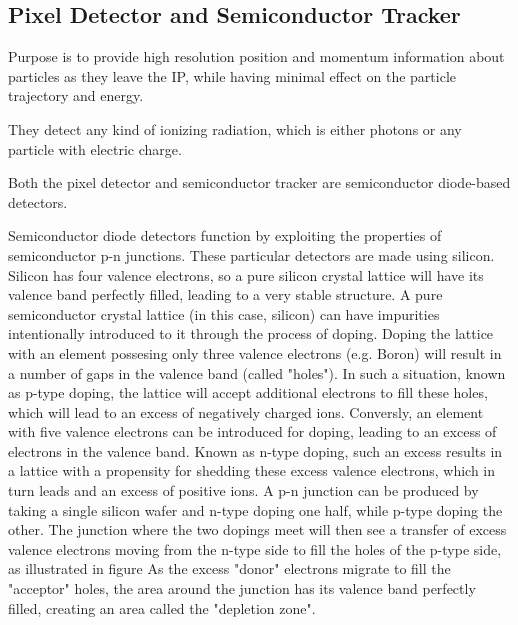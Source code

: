     \subsection{Pixel Detector and Semiconductor Tracker}
        Purpose is to provide high resolution position and momentum information about particles as they leave the IP,
        while having minimal effect on the particle trajectory and energy.

        They detect any kind of ionizing radiation, which is either photons or any particle with electric charge.

        Both the pixel detector and semiconductor tracker are semiconductor diode-based detectors.

        Semiconductor diode detectors function by exploiting the properties of semiconductor p-n junctions.
        These particular detectors are made using silicon.
        Silicon has four valence electrons, so a pure silicon crystal lattice will have its valence band perfectly filled, leading to a very stable structure.
        A pure semiconductor crystal lattice (in this case, silicon) can have impurities intentionally introduced to it through the process of doping.
        Doping the lattice with an element possesing only three valence electrons (e.g. Boron) will result in a number of gaps in the valence band (called "holes").
        In such a situation, known as p-type doping, the lattice will accept additional electrons to fill these holes, which will lead to an excess of negatively charged ions.
        Conversly, an element with five valence electrons can be introduced for doping, leading to an excess of electrons in the valence band.
        Known as n-type doping, such an excess results in a lattice with a propensity for shedding these excess valence electrons, which in turn leads and an excess of positive ions.
        A p-n junction can be produced by taking a single silicon wafer and n-type doping one half, while p-type doping the other.
        The junction where the two dopings meet will then see a transfer of excess valence electrons moving from the n-type side to fill the holes of the p-type side, as illustrated in figure %
        As the excess "donor" electrons migrate to fill the "acceptor" holes, the area around the junction has its valence band perfectly filled, creating an area called the "depletion zone".
